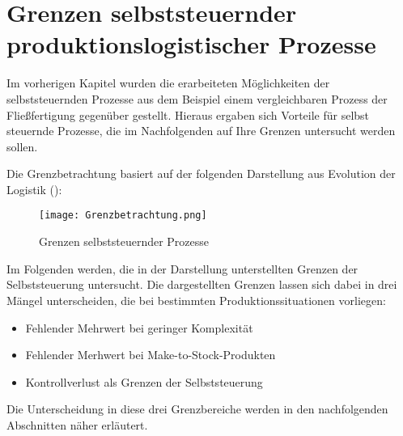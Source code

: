 \section{Grenzen selbststeuernder produktionslogistischer Prozesse}
\label{sec:Grenzen}

Im vorherigen Kapitel wurden die erarbeiteten Möglichkeiten der
selbststeuernden Prozesse aus dem Beispiel einem vergleichbaren Prozess der
Fließfertigung gegenüber gestellt. Hieraus ergaben sich Vorteile für selbst
steuernde Prozesse, die im Nachfolgenden auf Ihre Grenzen untersucht werden
sollen.

Die Grenzbetrachtung basiert auf der folgenden Darstellung aus Evolution der
Logistik (\citet{evolution2007}):

\begin{figure}[htb] 
\centering
\texttt{[image: Grenzbetrachtung.png]}
\caption[Grenzbetrachtung]{Grenzen selbststeuernder Prozesse\protect\footnotemark}
\label{fig:Grenzbetrachtung}
\end{figure}

Im Folgenden werden, die in der Darstellung unterstellten Grenzen der
Selbststeuerung untersucht. Die dargestellten Grenzen lassen sich dabei in drei
Mängel unterscheiden, die bei bestimmten Produktionssituationen vorliegen:

\begin{itemize}
  \item Fehlender Mehrwert bei geringer Komplexität
  \item Fehlender Merhwert bei Make-to-Stock-Produkten
  \item Kontrollverlust als Grenzen der Selbststeuerung
\end{itemize}

Die Unterscheidung in diese drei Grenzbereiche werden in den nachfolgenden 
Abschnitten näher erläutert.



